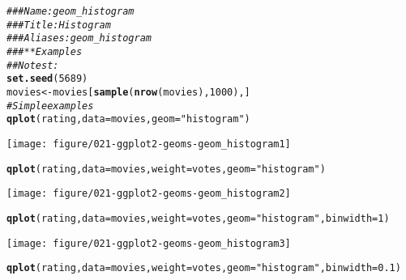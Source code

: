\documentclass[a4paper,titlepage]{tufte-handout}\usepackage[]{graphicx}\usepackage[]{color}
\makeatletter
\def\maxwidth{ %
  \ifdim\Gin@nat@width>\linewidth
    \linewidth
  \else
    \Gin@nat@width
  \fi
}
\newcommand{\hlnum}[1]{\textcolor[rgb]{0.686,0.059,0.569}{#1}}%
\newcommand{\hlstr}[1]{\textcolor[rgb]{0.192,0.494,0.8}{#1}}%
\newcommand{\hlcom}[1]{\textcolor[rgb]{0.678,0.584,0.686}{\textit{#1}}}%
\newcommand{\hlstd}[1]{\textcolor[rgb]{0.345,0.345,0.345}{#1}}%
\newcommand{\hlkwb}[1]{\textcolor[rgb]{0.69,0.353,0.396}{#1}}%
\newcommand{\hlkwc}[1]{\textcolor[rgb]{0.333,0.667,0.333}{#1}}%
\newcommand{\hlkwd}[1]{\textcolor[rgb]{0.737,0.353,0.396}{\textbf{#1}}}%
\newenvironment{kframe}{%
 \def\at@end@of@kframe{}%
 \ifinner\ifhmode%
  \def\at@end@of@kframe{\end{minipage}}%
  \begin{minipage}{\columnwidth}%
 \fi\fi%
 \def\FrameCommand##1{\hskip\@totalleftmargin \hskip-\fboxsep
 \colorbox{shadecolor}{##1}\hskip-\fboxsep
     \hskip-\linewidth \hskip-\@totalleftmargin \hskip\columnwidth}%
 \MakeFramed {\advance\hsize-\width
   \@totalleftmargin\z@ \linewidth\hsize
   \@setminipage}}%
 {\par\unskip\endMakeFramed%
 \at@end@of@kframe}
\newenvironment{knitrout}{}{} %
\makeatother
\begin{document}
\begin{knitrout}
\color{fgcolor}\begin{kframe}
\begin{alltt}
\hlcom{### Name: geom_histogram}
\hlcom{### Title: Histogram}
\hlcom{### Aliases: geom_histogram}
\hlcom{### ** Examples}
\hlcom{## No test: }
\hlkwd{set.seed}\hlstd{(}\hlnum{5689}\hlstd{)}
\hlstd{movies} \hlkwb{<-} \hlstd{movies[}\hlkwd{sample}\hlstd{(}\hlkwd{nrow}\hlstd{(movies),} \hlnum{1000}\hlstd{), ]}
\hlcom{# Simple examples}
\hlkwd{qplot}\hlstd{(rating,} \hlkwc{data}\hlstd{=movies,} \hlkwc{geom}\hlstd{=}\hlstr{"histogram"}\hlstd{)}
\end{alltt}


{\ttfamily\noindent\itshape\color{messagecolor}{\#\# stat\_bin: binwidth defaulted to range/30. Use 'binwidth = x' to adjust this.}}

{\ttfamily\noindent\color{warningcolor}{\#\# Warning: position\_stack requires constant width: output may be incorrect}}\end{kframe}
\texttt{[image: figure/021-ggplot2-geoms-geom\_histogram1]} 
\begin{kframe}\begin{alltt}
\hlkwd{qplot}\hlstd{(rating,} \hlkwc{data}\hlstd{=movies,} \hlkwc{weight}\hlstd{=votes,} \hlkwc{geom}\hlstd{=}\hlstr{"histogram"}\hlstd{)}
\end{alltt}


{\ttfamily\noindent\itshape\color{messagecolor}{\#\# stat\_bin: binwidth defaulted to range/30. Use 'binwidth = x' to adjust this.}}

{\ttfamily\noindent\color{warningcolor}{\#\# Warning: position\_stack requires constant width: output may be incorrect}}\end{kframe}
\texttt{[image: figure/021-ggplot2-geoms-geom\_histogram2]} 
\begin{kframe}\begin{alltt}
\hlkwd{qplot}\hlstd{(rating,} \hlkwc{data}\hlstd{=movies,} \hlkwc{weight}\hlstd{=votes,} \hlkwc{geom}\hlstd{=}\hlstr{"histogram"}\hlstd{,} \hlkwc{binwidth}\hlstd{=}\hlnum{1}\hlstd{)}
\end{alltt}
\end{kframe}
\texttt{[image: figure/021-ggplot2-geoms-geom\_histogram3]} 
\begin{kframe}\begin{alltt}
\hlkwd{qplot}\hlstd{(rating,} \hlkwc{data}\hlstd{=movies,} \hlkwc{weight}\hlstd{=votes,} \hlkwc{geom}\hlstd{=}\hlstr{"histogram"}\hlstd{,} \hlkwc{binwidth}\hlstd{=}\hlnum{0.1}\hlstd{)}
\end{alltt}



\end{kframe}
\end{knitrout}
\end{document}
